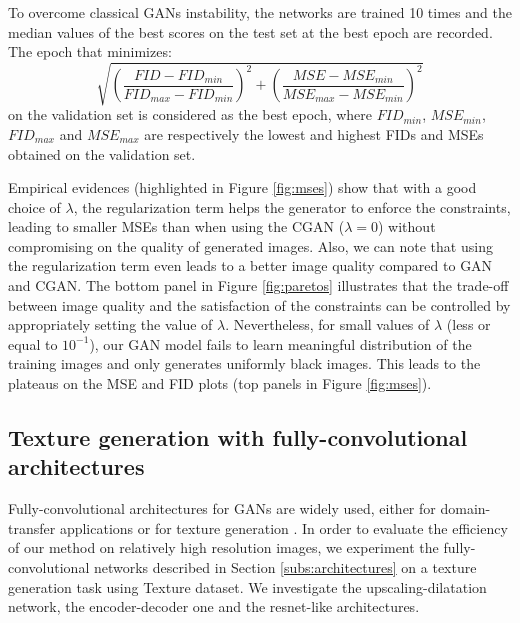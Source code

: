 To overcome classical GANs instability, the networks are trained 10 times and the median values of the best scores on the test set at the best epoch 
are recorded. The epoch that minimizes:
\begin{equation*}
\sqrt{\left(\frac{FID - FID_{min}}{FID_{max}- FID_{min}}\right)^2 + \left(\frac{MSE - MSE_{min}}{MSE_{max}- MSE_{min}}\right)^2}
\end{equation*}  on the validation set is considered as the best epoch, where $FID_{min}$, $MSE_{min}$, $FID_{max}$ and $MSE_{max}$ are respectively the lowest and highest FIDs and MSEs obtained on the validation set.

Empirical evidences (highlighted in Figure \ref{fig:mses}) show that with a good choice of $\lambda$, the regularization term helps the generator to enforce the constraints, leading to smaller MSEs than when using the CGAN ($\lambda=0$) without compromising on the quality of generated images. Also, we can note that using the regularization term even leads to a better image quality compared to GAN and CGAN.
%
The bottom panel in Figure \ref{fig:paretos} illustrates that the trade-off between image quality and the satisfaction of the constraints can be controlled by appropriately setting the value of $\lambda$. Nevertheless, for small values of $\lambda$ (less or equal to $10^{-1}$), our GAN model fails to learn meaningful distribution of the training images and only generates uniformly black images. This leads to the plateaus on the MSE and FID plots (top panels in Figure \ref{fig:mses}).



\subsection{Texture generation with fully-convolutional architectures}
\label{sub:fcnn}
Fully-convolutional architectures for GANs are widely used, either for domain-transfer applications \cite{Zhu2017unpaired}\cite{Isola2017} or for texture generation \cite{jetchev2016texture}. In order to evaluate the efficiency of our method on relatively high resolution images, we experiment the fully-convolutional networks described in Section \ref{subs:architectures} on a texture generation task using Texture dataset. We investigate the upscaling-dilatation network, the encoder-decoder one and the resnet-like architectures.

